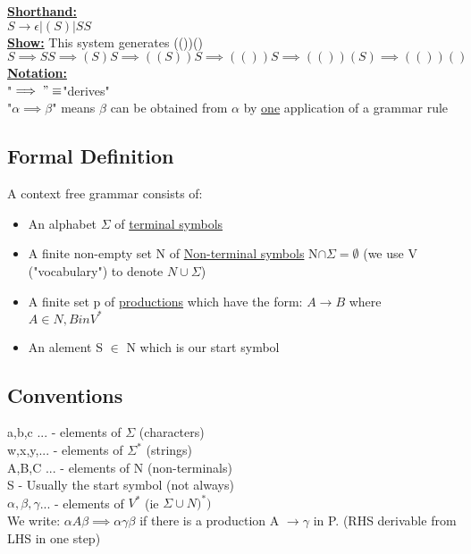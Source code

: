 \documentclass[12pt]{article}
\newcommand{\myt}[1]{\textbf{\underline{#1}}}
\begin{document}
	\myt{Shorthand:}\\
	$S \rightarrow \epsilon | (S) | SS$\\
	
	\myt{Show:} This system generates (())()\\
	$S \implies SS \implies (S)S \implies ((S))S \implies (())S \implies (())(S) \implies (())()$\\
	
	\myt{Notation:}\\
	"$\implies" \equiv $"derives"\\
	"$\alpha \implies \beta$" means $\beta$ can be obtained from $\alpha$ by \underline{one} application of a grammar rule\\
	
	\subsection*{Formal Definition}
	A context free grammar consists of:
	\begin{itemize}
		\item An alphabet $\Sigma$ of \underline{terminal symbols}
		\item A finite non-empty set N of \underline{Non-terminal symbols}
				N$\cap \Sigma = \emptyset$ (we use V ("vocabulary") to denote $N \cup \Sigma$)
		\item A finite set p of \underline{productions} which have the form: $A \rightarrow B$ where $A \in N, B in V^*$
		\item An alement S $\in$ N which is our start symbol
	\end{itemize}
	
	\subsection*{Conventions}
	a,b,c ... - elements of $\Sigma$ (characters)\\
	w,x,y,... - elements of $\Sigma^*$ (strings)\\
	A,B,C ... - elements of N (non-terminals)\\
	S - Usually the start symbol (not always)\\
	$\alpha, \beta, \gamma$... - elements of $V^*$ (ie $\Sigma \cup N)^*)$\\
	
	We write: $\alpha A \beta \implies \alpha \gamma \beta$ if there is a production A $\rightarrow \gamma$ in P. (RHS derivable from LHS in one step)\\
	
\end{document}
